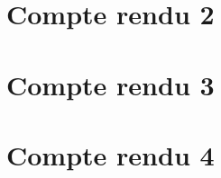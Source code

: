 \documentclass[11pt,a4paper]{report}
\begin{document}


\chapter{Compte rendu 2}%
\label{cha:compte_rendu_2}



\chapter{Compte rendu 3}%
\label{cha:compte_rendu_3}



\chapter{Compte rendu 4}%
\label{cha:compte_rendu_4}



\end{document}

